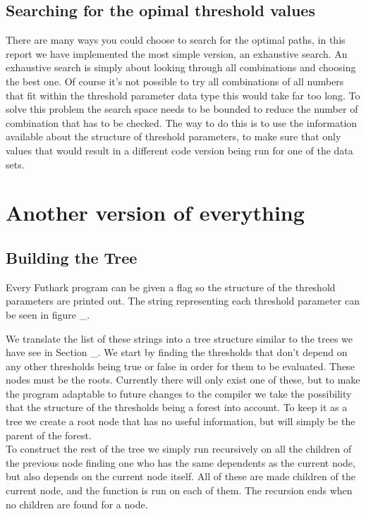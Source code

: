 \subsection{Searching for the opimal threshold values}
There are many ways you could choose to search for the optimal paths, in this
report we have implemented the most simple version, an exhaustive search. An
exhaustive search is simply about looking through all combinations and choosing
the best one. Of course it's not possible to try all combinations of all numbers
that fit within the threshold parameter data type this would take far too long. 
To solve this problem the search space needs to be bounded to reduce the number
of combination that has to be checked. The way to do this is to use the
information available about the structure of threshold parameters, to make sure
that only values that would result in a different code version being run for 
one of the data sets. 

\section{Another version of everything}
\subsection{Building the Tree}
Every Futhark program can be given a flag so the structure of the threshold 
parameters are printed out. The string representing each threshold parameter
can be seen in figure \_. 

We translate the list of these strings into a tree structure similar to the
trees we have see in Section \_. 
We start by finding the thresholds that don't depend on any other thresholds
being true or false in order for them to be evaluated. These nodes must be the
roots. Currently there will only exist one of these, but to make the program
adaptable to future changes to the compiler we take the possibility that the
structure of the thresholds being a forest into account. To keep it as a tree
we create a root node that has no useful information, but will simply be the
parent of the forest. \\

To construct the rest of the tree we simply run recursively on all the children
of the previous node finding one who has the same dependents as the current
node, but also depends on the current node itself. All of these are made
children of the current node, and the function is run on each of them. The
recursion ends when no children are found for a node.

